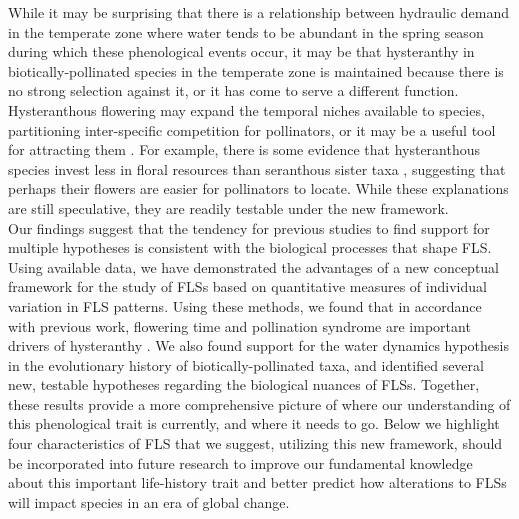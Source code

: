 \documentclass{article}
\begin{document}
\noindent While it may be surprising that there is a relationship between hydraulic demand in the temperate zone where water tends to be abundant in the spring season during which these phenological events occur\citep{Polgar2011}, it may be that hysteranthy in biotically-pollinated species in the temperate zone is maintained because there is no strong selection against it, or it has come to serve a different function. Hysteranthous flowering may expand the temporal niches available to species, partitioning inter-specific competition for pollinators, or it may be a useful tool for attracting them \citep{Janzen1967}. For example, there is some evidence that hysteranthous species invest less in floral resources than seranthous sister taxa \citep{Gunatilleke1984}, suggesting that perhaps their flowers are easier for pollinators to locate. While these explanations are still speculative, they are readily testable under the new framework.\\



\noindent Our findings suggest that the tendency for previous studies to find support for multiple hypotheses \citep{Bolmgren2003,Gougherty2018,Savage2019} is consistent with the biological processes that shape FLS. Using available data, we have demonstrated the advantages of a new conceptual framework for the study of FLSs based on quantitative measures of individual variation in FLS patterns. Using these methods, we found that in accordance with previous work, flowering time and pollination syndrome are important drivers of hysteranthy \citep{Gougherty2018}. We also found support for the water dynamics hypothesis in the evolutionary history of biotically-pollinated taxa, and identified several new, testable hypotheses regarding the biological nuances of FLSs. Together, these results provide a more comprehensive picture of where our understanding of this phenological trait is currently, and where it needs to go. Below we highlight four characteristics of FLS that we suggest, utilizing this new framework, should be incorporated into future research to improve our fundamental knowledge about this important life-history trait and better predict how alterations to FLSs will impact species in an era of global change.
\end{document}
